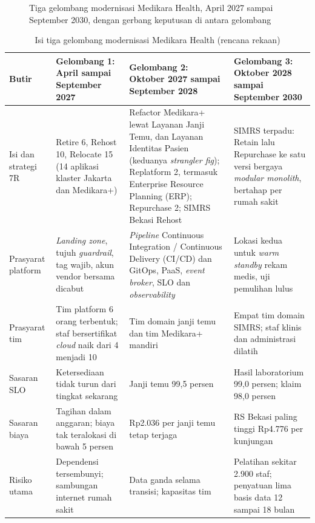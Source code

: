 \begin{figure}[!htb]
  \centering
  
  \caption{Tiga gelombang modernisasi Medikara Health, April 2027 sampai September 2030, dengan
           gerbang keputusan di antara gelombang}
  \label{fig:ch14-gelombang}
\end{figure}

\begin{table}[!htb]
  \centering
  \caption{Isi tiga gelombang modernisasi Medikara Health (rencana rekaan)}
  \label{tab:ch14-isi-gelombang}
  \footnotesize
  \begin{tabularx}{\textwidth}{>{\raggedright\arraybackslash}p{2.0cm}
      >{\raggedright\arraybackslash}X >{\raggedright\arraybackslash}X
      >{\raggedright\arraybackslash}X}
    \hline
    \textbf{Butir} & \textbf{Gelombang 1: April sampai September 2027} & \textbf{Gelombang 2: Oktober
      2027 sampai September 2028} & \textbf{Gelombang 3: Oktober 2028 sampai September 2030} \\ \hline
    Isi dan strategi 7R & Retire 6, Rehost 10, Relocate 15 (14 aplikasi klaster Jakarta dan
      Medikara+) & Refactor Medikara+ lewat Layanan Janji Temu, dan Layanan Identitas Pasien
      (keduanya \textit{strangler fig}); Replatform 2, termasuk Enterprise Resource Planning (ERP);
      Repurchase 2; SIMRS Bekasi Rehost & SIMRS
      terpadu: Retain lalu Repurchase ke satu versi bergaya \textit{modular monolith}, bertahap per
      rumah sakit \\ \hline
    Prasyarat platform & \textit{Landing zone}, tujuh \textit{guardrail}, tag wajib, akun vendor
      bersama dicabut & \textit{Pipeline} Continuous Integration / Continuous Delivery (CI/CD) dan
      GitOps, PaaS, \textit{event broker}, SLO dan \textit{observability} & Lokasi kedua untuk \textit{warm standby} rekam medis, uji pemulihan
      lulus \\ \hline
    Prasyarat tim & Tim platform 6 orang terbentuk; staf bersertifikat \textit{cloud} naik dari 4
      menjadi 10 & Tim domain janji temu dan tim Medikara+ mandiri & Empat tim domain SIMRS; staf
      klinis dan administrasi dilatih \\ \hline
    Sasaran SLO & Ketersediaan tidak turun dari tingkat sekarang & Janji temu 99,5 persen &
      Hasil laboratorium 99,0 persen; klaim 98,0 persen \\ \hline
    Sasaran biaya & Tagihan dalam anggaran; biaya tak teralokasi di bawah 5 persen & Rp2.036 per
      janji temu tetap terjaga & RS Bekasi paling tinggi Rp4.776 per kunjungan \\ \hline
    Risiko utama & Dependensi tersembunyi; sambungan internet rumah sakit & Data ganda selama
      transisi; kapasitas tim & Pelatihan sekitar 2.900 staf; penyatuan lima basis data 12 sampai
      18 bulan \\ \hline
  \end{tabularx}
\end{table}

